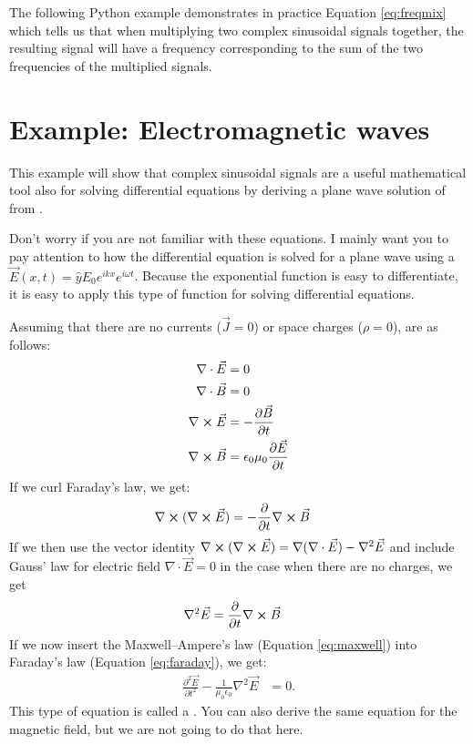 The following Python example demonstrates in practice
Equation \ref{eq:freqmix} which tells us that when multiplying two complex sinusoidal signals together, the resulting signal will have a frequency corresponding to the sum of the two frequencies of the multiplied signals.



\section{Example: Electromagnetic waves}
\label{waveeq}

This example will show that complex sinusoidal signals are a useful mathematical tool also for solving differential equations by deriving a plane wave solution of  from .

Don't worry if you are not familiar with these equations. I mainly want you to pay attention to how the differential equation is solved for a plane wave using a  $\vec{E}(x,t)=\hat{y}E_0 e^{i k x}e^{i\omega t}$. Because the exponential function is easy to differentiate, it is easy to apply this type of function for solving differential equations.

Assuming that there are no currents ($\vec{J}=0$) or space charges ($\rho=0$),  are as follows:
\begin{align}
\nabla \cdot \vec{E} &= 0 \\
\nabla \cdot \vec{B} &= 0 \\
\nabla \cross \vec{E} &= -\frac{\partial \vec{B}}{\partial t} \label{eq:faraday}\\
\nabla \cross \vec{B} &= \epsilon_0 \mu_0 \frac{\partial \vec{E}}{\partial t} \label{eq:maxwell}
\end{align}
If we curl Faraday's law, we get:
\begin{align}
\nabla \cross (\nabla \cross \vec{E}) &= -\frac{\partial }{\partial t}\nabla \cross \vec{B}
\end{align}
If we then use the vector identity
$\nabla \cross (\nabla \cross \vec{E}) = \nabla(\nabla \cdot \vec{E}) - \nabla^2 \vec{E}$ and include Gauss' law for electric field $\nabla \cdot \vec{E} = 0$ in the case when there are no charges, we get
\begin{align}
\nabla^2 \vec{E} &= \frac{\partial }{\partial t}\nabla \cross \vec{B}
\end{align}
If we now insert the Maxwell–Ampere's law (Equation \ref{eq:maxwell}) into Faraday's
law (Equation \ref{eq:faraday}), we get:
\begin{align}
\frac{\partial^2 \vec{E}}{\partial t^2} - \frac{1}{\mu_0 \epsilon_0} \nabla^2 \vec{E} &= 0.
\end{align}
This type of equation is called a . You can also derive the same equation for the magnetic field, but we are not going to do that here.

